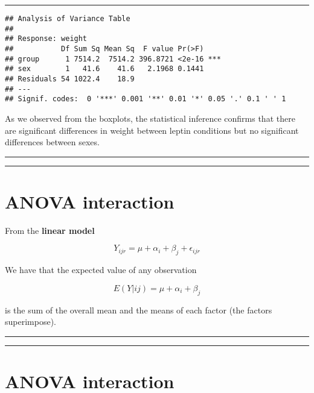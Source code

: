 \documentclass[
]{book}
\begin{document}
\begin{center}\rule{0.5\linewidth}{0.5pt}\end{center}

\begin{verbatim}
## Analysis of Variance Table
## 
## Response: weight
##           Df Sum Sq Mean Sq  F value Pr(>F)    
## group      1 7514.2  7514.2 396.8721 <2e-16 ***
## sex        1   41.6    41.6   2.1968 0.1441    
## Residuals 54 1022.4    18.9                    
## ---
## Signif. codes:  0 '***' 0.001 '**' 0.01 '*' 0.05 '.' 0.1 ' ' 1
\end{verbatim}

As we observed from the boxplots, the statistical inference confirms that there are significant differences in weight between leptin conditions but no significant differences between sexes.

\begin{center}\rule{0.5\linewidth}{0.5pt}\end{center}

\begin{center}\rule{0.5\linewidth}{0.5pt}\end{center}

\hypertarget{anova-interaction}{%
\section{ANOVA interaction}\label{anova-interaction}}

From the \textbf{linear model}

\[Y_{ijr} = \mu + \alpha_i + \beta_j + \epsilon_{ijr}\]

We have that the expected value of any observation

\[E(Y|ij)=\mu + \alpha_i+ \beta_j\]

is the sum of the overall mean and the means of each factor (the factors superimpose).

\begin{center}\rule{0.5\linewidth}{0.5pt}\end{center}

\begin{center}\rule{0.5\linewidth}{0.5pt}\end{center}

\hypertarget{anova-interaction-1}{%
\section{ANOVA interaction}\label{anova-interaction-1}}
\end{document}
